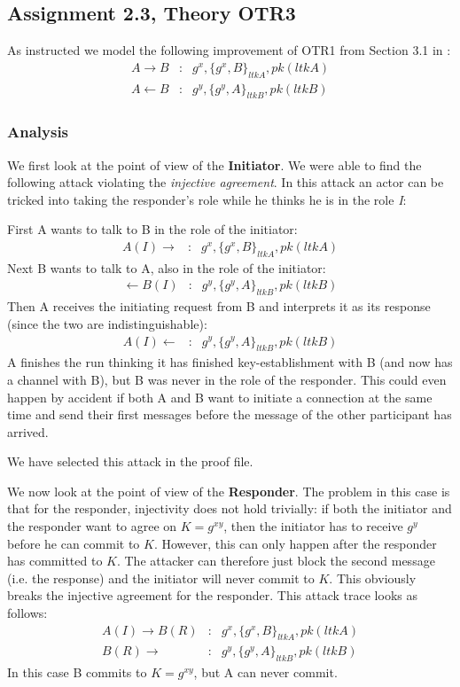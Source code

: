 \documentclass[a4paper]{article}
\begin{document}
\subsection{Assignment 2.3, Theory OTR3}
As instructed we model the following improvement of OTR1 from Section 3.1 in \cite{1}:
\begin{eqnarray*}
A \to B            & : & {g^x}, \{{g^x},B\}_{ltkA}, {pk(ltkA)}\\
A \leftarrow B & : & {g^y}, \{{g^y},A\}_{ltkB}, {pk(ltkB)}
\end{eqnarray*}

\subsubsection*{Analysis}
We first look at the point of view of the {\bf Initiator}. We were able to find the following attack violating the {\em injective agreement}. In this attack an actor can be tricked into taking the responder's role while he thinks he is in the role {\em I}: \par \noindent
First A wants to talk to B in the role of the initiator:
\begin{eqnarray*}
A(I) \to                  & : & {g^x}, \{{g^x},B\}_{ltkA}, {pk(ltkA)}
\end{eqnarray*}
Next B wants to talk to A, also in the role of the initiator:
\begin{eqnarray*}
       \leftarrow B(I) & : & {g^y}, \{{g^y},A\}_{ltkB}, {pk(ltkB)}
\end{eqnarray*}
Then A receives the initiating request from B and interprets it as its response (since the two are indistinguishable):
\begin{eqnarray*}
A(I) \leftarrow        & : & {g^y}, \{{g^y},A\}_{ltkB}, {pk(ltkB)}
\end{eqnarray*}
A finishes the run thinking it has finished key-establishment with B (and now has a channel with B), but B was never in the role of the responder. This could even happen by accident if both A and B want to initiate a connection at the same time and send their first messages before the message of the other participant has arrived. \par \noindent
We have selected this attack in the proof file. \par

We now look at the point of view of the {\bf Responder}. The problem in this case is that for the responder, injectivity does not hold trivially: if both the initiator and the responder want to agree on ${K=g^{xy}}$, then the initiator has to receive ${g^y}$ before he can commit to $K$. However, this can only happen after the responder has committed to $K$. The attacker can therefore just block the second message (i.e. the response) and the initiator will never commit to $K$. This obviously breaks the injective agreement for the responder. This attack trace looks as follows:
\begin{eqnarray*}
A(I)   \to              B(R) & : & {g^x}, \{{g^x},B\}_{ltkA}, {pk(ltkA)}\\
B(R) \to                      & : & {g^y}, \{{g^y},A\}_{ltkB}, {pk(ltkB)}
\end{eqnarray*}
In this case B commits to ${K=g^{xy}}$, but A can never commit.
\end{document}
